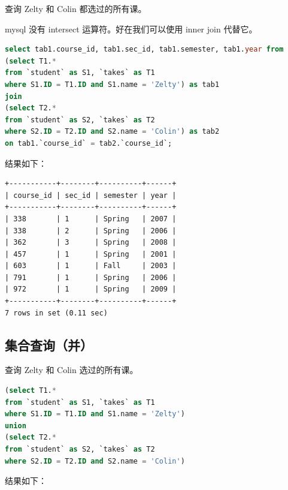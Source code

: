 \documentclass{article}
\begin{document}
查询 Zelty 和 Colin 都选过的所有课。

mysql 没有 intersect 运算符。好在我们可以使用 inner join 代替它。

\begin{lstlisting}[language=sql]
select tab1.course_id, tab1.sec_id, tab1.semester, tab1.year from 
(select T1.*
from `student` as S1, `takes` as T1
where S1.ID = T1.ID and S1.name = 'Zelty') as tab1
join
(select T2.*
from `student` as S2, `takes` as T2
where S2.ID = T2.ID and S2.name = 'Colin') as tab2
on tab1.`course_id` = tab2.`course_id`;
\end{lstlisting}

结果如下：

\begin{lstlisting}
+-----------+--------+----------+------+
| course_id | sec_id | semester | year |
+-----------+--------+----------+------+
| 338       | 1      | Spring   | 2007 |
| 338       | 2      | Spring   | 2006 |
| 362       | 3      | Spring   | 2008 |
| 457       | 1      | Spring   | 2001 |
| 603       | 1      | Fall     | 2003 |
| 791       | 1      | Spring   | 2006 |
| 972       | 1      | Spring   | 2009 |
+-----------+--------+----------+------+
7 rows in set (0.11 sec)

\end{lstlisting}

\subsection{集合查询（并）}

查询 Zelty 和 Colin 选过的所有课。

\begin{lstlisting}[language=sql]
(select T1.*
from `student` as S1, `takes` as T1
where S1.ID = T1.ID and S1.name = 'Zelty')
union
(select T2.*
from `student` as S2, `takes` as T2
where S2.ID = T2.ID and S2.name = 'Colin')
\end{lstlisting}

结果如下：
\end{document}
